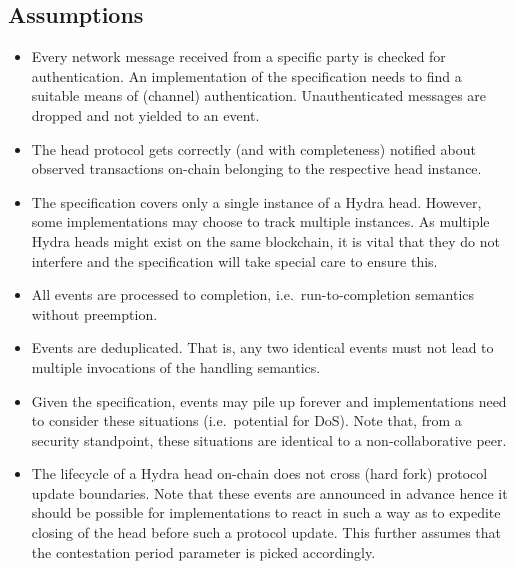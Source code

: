 \subsection{Assumptions}
\begin{itemize}
  \item Every network message received from a specific party is checked for
        authentication. An implementation of the specification needs to find a
        suitable means of (channel) authentication. Unauthenticated messages are
        dropped and not yielded to an event.
  \item The head protocol gets correctly (and with completeness) notified about
        observed transactions on-chain belonging to the respective head
        instance.
  \item The specification covers only a single instance of a Hydra head.
        However, some implementations may choose to track multiple instances. As
        multiple Hydra heads might exist on the same blockchain, it is vital
        that they do not interfere and the specification will take special care
        to ensure this.
  \item All events are processed to completion, i.e.\ run-to-completion semantics
        without preemption.
  \item Events are deduplicated. That is, any two identical events must not lead
        to multiple invocations of the handling semantics.
  \item Given the specification, events may pile up forever and implementations
        need to consider these situations (i.e.\ potential for DoS). Note that,
        from a security standpoint, these situations are identical to a
        non-collaborative peer.
  \item The lifecycle of a Hydra head on-chain does not cross (hard fork)
        protocol update boundaries. Note that these events are announced in
        advance hence it should be possible for implementations to react in such
        a way as to expedite closing of the head before such a protocol update.
        This further assumes that the contestation period parameter is picked
        accordingly.
\end{itemize}

